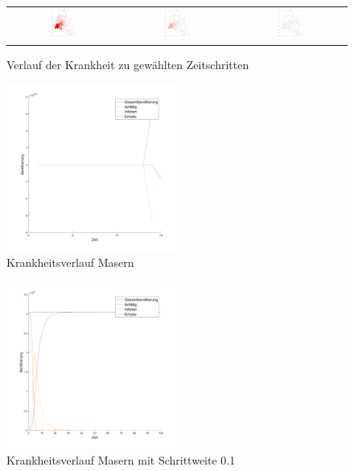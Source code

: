 \documentclass[11pt,a4paper]{article}
\begin{document}
\begin{figure}
\begin{tabular}{ccc}
  \includegraphics[width=0.3\textwidth]{bild1-60} &  
  \includegraphics[width=0.3\textwidth]{bild1-70} &  
   \includegraphics[width=0.3\textwidth]{bild1-80} \\
\end{tabular}
\caption{Verlauf der Krankheit zu gew\"ahlten Zeitschritten}
\end{figure}

\begin{figure}
\includegraphics[width=0.5\textwidth]{bild3-1}
\caption{Krankheitsverlauf Masern}
\end{figure}

\begin{figure}
\includegraphics[width=0.5\textwidth]{bild4-1}
\caption{Krankheitsverlauf Masern mit Schrittweite 0.1}
\end{figure}
  
\end{document}
